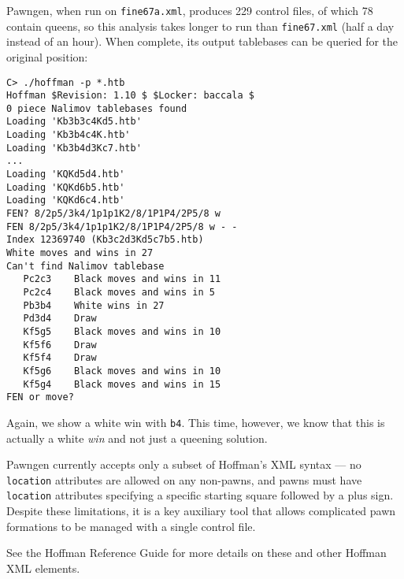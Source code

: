 \documentclass[11pt]{article}
\begin{document}
Pawngen, when run on {\tt fine67a.xml}, produces 229 control files, of
which 78 contain queens, so this analysis takes longer to run than
{\tt fine67.xml} (half a day instead of an hour).  When complete, its
output tablebases can be queried for the original position:

\begin{verbatim}
C> ./hoffman -p *.htb
Hoffman $Revision: 1.10 $ $Locker: baccala $
0 piece Nalimov tablebases found
Loading 'Kb3b3c4Kd5.htb'
Loading 'Kb3b4c4K.htb'
Loading 'Kb3b4d3Kc7.htb'
...
Loading 'KQKd5d4.htb'
Loading 'KQKd6b5.htb'
Loading 'KQKd6c4.htb'
FEN? 8/2p5/3k4/1p1p1K2/8/1P1P4/2P5/8 w
FEN 8/2p5/3k4/1p1p1K2/8/1P1P4/2P5/8 w - -
Index 12369740 (Kb3c2d3Kd5c7b5.htb)
White moves and wins in 27
Can't find Nalimov tablebase
   Pc2c3    Black moves and wins in 11
   Pc2c4    Black moves and wins in 5
   Pb3b4    White wins in 27
   Pd3d4    Draw
   Kf5g5    Black moves and wins in 10
   Kf5f6    Draw
   Kf5f4    Draw
   Kf5g6    Black moves and wins in 10
   Kf5g4    Black moves and wins in 15
FEN or move?
\end{verbatim}

Again, we show a white win with {\tt b4}.  This time, however, we know
that this is actually a white {\it win} and not just a queening
solution.


Pawngen currently accepts only a subset of Hoffman's XML syntax --- no
{\tt location} attributes are allowed on any non-pawns, and pawns must
have {\tt location} attributes specifying a specific starting square
followed by a plus sign.  Despite these limitations, it is a key
auxiliary tool that allows complicated pawn formations to be managed
with a single control file.

See the Hoffman Reference Guide for more details on these and other
 Hoffman XML elements.
\end{document}
